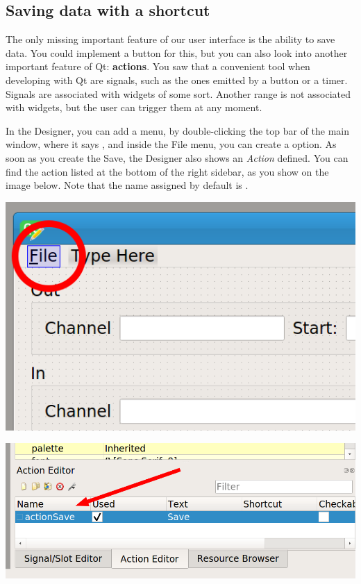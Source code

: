 \subsection{Saving data with a shortcut}\label{subsec:saving-data-with-a-shortcut}
The only missing important feature of our user interface is the ability to save data. You could implement a button for this, but you can also look into another important feature of Qt: \textbf{actions}. You saw that a convenient tool when developing with Qt are signals, such as the ones emitted by a button or a timer. Signals are associated with widgets of some sort. Another range is not associated with widgets, but the user can trigger them at any moment.

In the Designer, you can add a  menu, by double-clicking the top bar of the main window, where it says , and inside the File menu, you can create a  option. As soon as you create the Save, the Designer also shows an \emph{Action} defined. You can find the action listed at the bottom of the right sidebar, as you show on the image below. Note that the name assigned by default is .

\begin{minipage}{0.45\linewidth}
    \centering
    \includegraphics[width=\textwidth]{images/Chapter_09/13_menu_file.png}
\end{minipage}
\hspace{0.5cm}
\begin{minipage}{0.45\linewidth}
    \centering
    \includegraphics[width=\textwidth]{images/Chapter_09/13_action_save.png}
\end{minipage}

